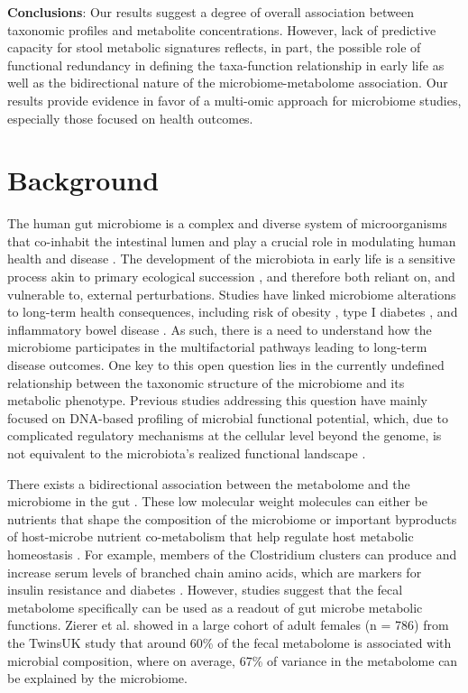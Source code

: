\noindent \textbf{Conclusions}: Our results suggest a degree of overall association between taxonomic profiles and metabolite concentrations. However, lack of predictive capacity for stool metabolic signatures reflects, in part, the possible role of functional redundancy in defining the taxa-function relationship in early life as well as the bidirectional nature of the microbiome-metabolome association. Our results provide evidence in favor of a multi-omic approach for microbiome studies, especially those focused on health outcomes.

\section{Background}
The human gut microbiome is a complex and diverse system of microorganisms that co-inhabit the intestinal  lumen and play a crucial role in modulating human health and disease \cite{shreiner2015gut, palmer2007development}. The development of the microbiota in early life is a sensitive process akin to primary ecological succession \cite{koenig2011succession}, and therefore both reliant on, and vulnerable to, external perturbations. Studies have linked microbiome alterations to long-term health consequences, including risk of obesity \cite{stanislawski2018gut}, type I diabetes \cite{kostic2015dynamics}, and inflammatory bowel disease \cite{arrieta2014intestinal}. As such, there is a need to understand how the microbiome participates in the multifactorial pathways leading to long-term disease outcomes. One key to this open question lies in the currently undefined relationship between the taxonomic structure of the microbiome and its metabolic phenotype. Previous studies addressing this question have mainly focused on DNA-based profiling of microbial functional potential, which, due to complicated regulatory mechanisms at the cellular level beyond the genome, is not equivalent to the microbiota’s realized functional landscape \cite{heintz-buschart2018human}.  

There exists a bidirectional association between the metabolome and the microbiome in the gut \cite{turnbaugh2008invitation, ewald2018human}. These low molecular weight molecules can either be nutrients that shape the composition of the microbiome \cite{oliphant2019macronutrient} or important byproducts of host-microbe nutrient co-metabolism that help regulate host metabolic homeostasis \cite{heinken2015systems, li2008symbiotic, nicholson2012hostgut}. For example, members of the Clostridium clusters can produce and increase serum levels of branched chain amino acids, which are markers for insulin resistance and diabetes \cite{pedersen2016human, neis2015role}. However, studies suggest that the fecal metabolome specifically can be used as a readout of gut microbe metabolic functions. Zierer et al. \cite{zierer2018fecal} showed in a large cohort of adult females (n = 786) from the TwinsUK study that around 60\% of the fecal metabolome is associated with microbial composition, where on average, 67\% of variance in the metabolome can be explained by the microbiome. 

